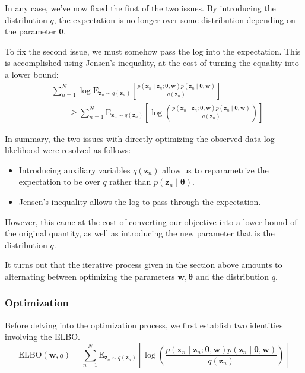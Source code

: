 In any case, we've now fixed the first of the two issues. By introducing the distribution $q$, the expectation is no longer over some distribution depending on the parameter $\boldsymbol{\theta}$. 

To fix the second issue, we must somehow pass the log into the expectation. This is accomplished using Jensen's inequality, at the cost of turning the equality into a lower bound:
\begin{align}
    &\sum_{n = 1} ^N \log \mathrm{E}_{\mathbf{z}_n \sim q(\mathbf{z}_n)} \left[\frac{p(\mathbf{x}_n \mid \mathbf{z}_n; \boldsymbol\theta, \mathbf{w}) p(\mathbf{z}_n \mid \boldsymbol\theta, \mathbf{w} ) }{q(\mathbf{z}_n)}\right] \\
    &\qquad\geq \sum_{n = 1} ^N \mathrm{E}_{\mathbf{z}_n \sim q(\mathbf{z}_n)} \left[\log\left(\frac{p(\mathbf{x}_n \mid \mathbf{z}_n; \boldsymbol\theta, \mathbf{w}) p(\mathbf{z}_n \mid \boldsymbol\theta, \mathbf{w} ) }{q(\mathbf{z}_n)}\right)\right] 
\end{align}

In summary, the two issues with directly optimizing the observed data log likelihood were resolved as follows:
\begin{itemize}
    \item Introducing auxiliary variables $q(\mathbf{z}_n)$ allow us to reparametrize the expectation to be over $q$ rather than $p(\mathbf{z}_n \mid \boldsymbol{\theta})$. 
    \item Jensen's inequality allows the log to pass through the expectation.
\end{itemize}
However, this came at the cost of converting our objective into a lower bound of the original quantity, as well as introducing the new parameter that is the distribution $q$. 

It turns out that the iterative process given in the section above amounts to alternating between optimizing the parameters $\mathbf{w}, \boldsymbol{\theta}$ and the distribution $q$. 

\subsubsection{Optimization}
Before delving into the optimization process, we first establish two identities involving the ELBO.
\begin{equation}
    \mathrm{ELBO}(\mathbf{w}, q) = \sum_{n = 1} ^N \mathrm{E}_{\mathbf{z}_n \sim q(\mathbf{z}_n)} \left[\log\left(\frac{p(\mathbf{x}_n \mid \mathbf{z}_n; \boldsymbol\theta, \mathbf{w}) p(\mathbf{z}_n \mid \boldsymbol\theta, \mathbf{w} ) }{q(\mathbf{z}_n)}\right)\right]
\end{equation}

